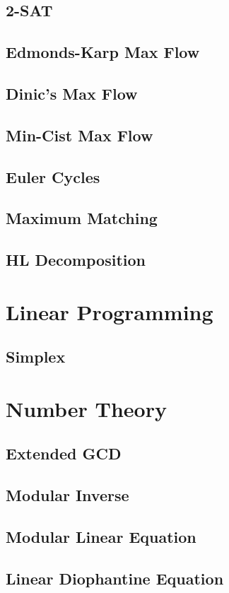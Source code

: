 \documentclass[twocolumn]{article}
\begin{document}
		\subsection{2-SAT}
		\subsection{Edmonds-Karp Max Flow}
		\subsection{Dinic's Max Flow}
		\subsection{Min-Cist Max Flow}
		\subsection{Euler Cycles}
		\subsection{Maximum Matching}
		\subsection{HL Decomposition}
	\section{Linear Programming}
		\subsection{Simplex}
	\section{Number Theory}
		\subsection{Extended GCD}
		\subsection{Modular Inverse}
		\subsection{Modular Linear Equation}
		\subsection{Linear Diophantine Equation}
\end{document}
